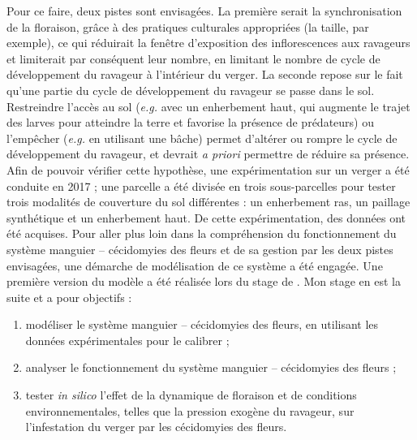 
Pour ce faire, deux pistes sont envisagées.
La première serait la synchronisation de la floraison, grâce à des pratiques culturales appropriées (la taille, par exemple), ce qui réduirait la fenêtre d'exposition des inflorescences aux ravageurs et limiterait par conséquent leur nombre, en limitant le nombre de cycle de développement du ravageur à l'intérieur du verger.
La seconde repose sur le fait qu'une partie du cycle de développement du ravageur se passe dans le sol.
Restreindre l'accès au sol (\emph{e.g.} avec un enherbement haut, qui augmente le trajet des larves pour atteindre la terre et favorise la présence de prédateurs) ou l'empêcher (\emph{e.g.} en utilisant une bâche) permet d'altérer ou rompre le cycle de développement du ravageur, et devrait \emph{a priori} permettre de réduire sa présence. 
Afin de pouvoir vérifier cette hypothèse, une expérimentation sur un verger a été conduite en 2017 ; une parcelle a été divisée en trois sous-parcelles pour tester trois modalités de couverture du sol différentes : un enherbement ras, un paillage synthétique et un enherbement haut. 
De cette expérimentation, des données ont été acquises.
Pour aller plus loin dans la compréhension du fonctionnement du système manguier -- cécidomyies des fleurs et de sa gestion par les deux pistes envisagées, une démarche de modélisation de ce système a été engagée.
Une première version du modèle a été réalisée lors du stage de \citet{laurie}.
Mon stage en est la suite et a pour objectifs :
\begin{enumerate}
 \item modéliser le système manguier -- cécidomyies des fleurs, en utilisant les données expérimentales pour le calibrer ;
 \item analyser le fonctionnement du système manguier -- cécidomyies des fleurs ;
 \item tester \emph{in silico} l'effet de la dynamique de floraison et de conditions environnementales, telles que la pression exogène du ravageur, sur l'infestation du verger par les cécidomyies des fleurs.
\end{enumerate}

